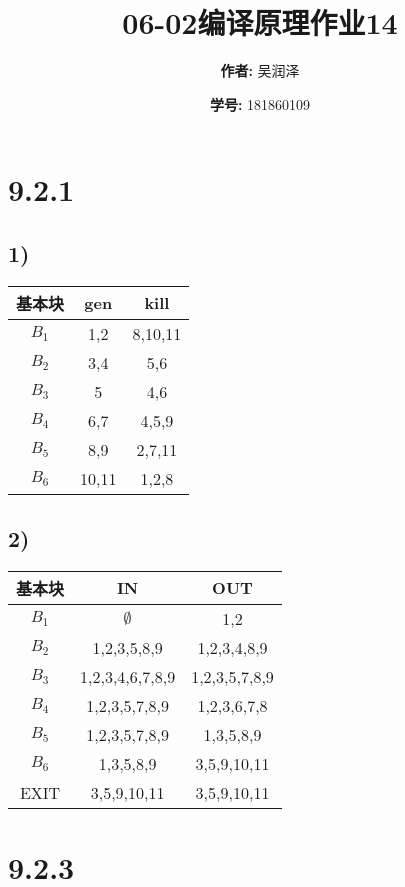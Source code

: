\documentclass[11pt]{article}
\title{06-02编译原理作业14}
\author{
			\textbf{作者:} {吴润泽}
			\and {\textbf{学号:} 181860109}
		}
\begin{document}
\maketitle
\section*{9.2.1}
\subsection*{1)}
\begin{table}[H]
\centering
\begin{tabular}{|c|c|c|}
	\hline
	\textbf{基本块} & \textbf{gen} & \textbf{kill} \\ \hline
	$B_1$ & 1,2 & 8,10,11 \\ \hline
	$B_2$ & 3,4 & 5,6 \\ \hline
	$B_3$ & 5 & 4,6 \\ \hline
	$B_4$ & 6,7 & 4,5,9 \\ \hline
	$B_5$ & 8,9 & 2,7,11 \\ \hline
	$B_6$ & 10,11 & 1,2,8 \\ \hline
\end{tabular}
\end{table}
\subsection*{2)}
\begin{table}[H]
\centering
\begin{tabular}{|c|c|c|}
	\hline
	\textbf{基本块} & \textbf{IN} & \textbf{OUT} \\ \hline
	$B_1$ & $\emptyset$ & 1,2 \\ \hline
	$B_2$ & 1,2,3,5,8,9 & 1,2,3,4,8,9 \\ \hline
	$B_3$ & 1,2,3,4,6,7,8,9 & 1,2,3,5,7,8,9 \\ \hline
	$B_4$ & 1,2,3,5,7,8,9 & 1,2,3,6,7,8 \\ \hline
	$B_5$ & 1,2,3,5,7,8,9 & 1,3,5,8,9 \\ \hline
	$B_6$ & 1,3,5,8,9 & 3,5,9,10,11 \\ \hline
	EXIT  & 3,5,9,10,11 & 3,5,9,10,11 \\ \hline
\end{tabular}
\end{table}
\section*{9.2.3}
\end{document}

